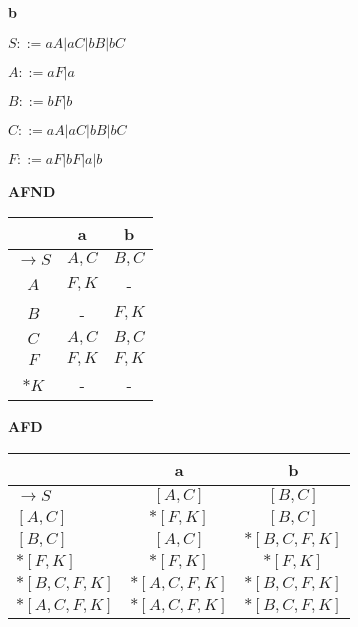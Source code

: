 \documentclass[ ]{article}
\begin{document}
		\newpage
		\textbf{b}
		
		$S ::= aA | aC | bB | bC$
		
		$A ::= aF | a$
		
		$B ::= bF | b$
		
		$C ::= aA | aC | bB | bC$
		
		$F ::= aF | bF | a | b$
		
		
\begin{center}
    \begin{minipage}[t]{0.48\textwidth} %
        \centering %
        \textbf{AFND}\\ %
        \vspace{0.2cm} %
        \begin{tabular}{|c|c|c|} %
            \toprule %
            & a & b \\
            \midrule %
            $\to S$ & $A,C$ & $B,C$\\
            $A$ & $F,K$ & - \\
            $B$ & - & $F,K$\\
            $C$ & $A,C$ & $B,C$\\
            $F$ & $F,K$ & $F,K$\\
            $*K$ & - & - \\
            \bottomrule %
        \end{tabular}
    \end{minipage}%
    \hfill %
    \begin{minipage}[t]{0.48\textwidth} %
        \centering %
        \textbf{AFD}\\ %
        \vspace{0.2cm} %
        \begin{tabular}{|l|c|c|} %
            \toprule %
            & a & b \\
            \midrule %
			$\to S$ & $[A,C]$ & $[B,C]$\\
			$[A,C]$ & $*[F,K]$ & $[B,C]$\\
			$[B,C]$ & $[A,C]$ & $*[B,C,F,K]$\\
			$*[F,K]$ & $*[F,K]$ & $*[F,K]$\\
			$*[B,C,F,K]$ & $*[A,C,F,K]$ & $*[B,C,F,K]$\\
			$*[A,C,F,K]$ & $*[A,C,F,K]$ & $*[B,C,F,K]$\\
            \bottomrule %
        \end{tabular}
    \end{minipage}
\end{center}
\end{document}
